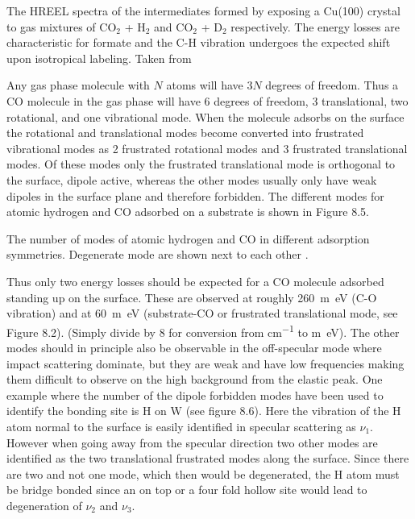 \vspace*{11cm}

 The HREEL spectra of the intermediates formed by exposing a Cu(100) crystal to gas mixtures of  CO$_{2}$ + H$_{2}$ and  CO$_{2}$ + D$_{2}$ respectively. The energy losses are characteristic for formate and the C-H vibration undergoes the expected shift upon isotropical labeling. Taken from \cite{Formate}

\vspace{1cm}

Any gas phase molecule with $N$ atoms  will have $3N$ degrees of freedom. Thus a CO molecule in the gas phase will have 6 degrees of freedom, 3 translational, two rotational, and one vibrational mode. When the molecule adsorbs on the surface the rotational and translational modes become converted into frustrated vibrational modes as 2 frustrated rotational modes and 3 frustrated translational modes. Of these modes only the frustrated translational mode is orthogonal to the surface, dipole active, whereas the other modes usually only have weak dipoles in the surface plane and therefore forbidden. The different modes for atomic hydrogen and CO adsorbed on a substrate is shown in Figure 8.5.

\vspace*{11cm}

 The number of modes of atomic hydrogen and CO in different adsorption symmetries. Degenerate mode are shown next to each other \cite{Bradshaw}.

\vspace{1cm} 

Thus only two energy losses should be expected for a CO molecule adsorbed standing up on the surface. These are observed at roughly \SI{260}{m\electronvolt} (C-O vibration) and at \SI{60}{m\electronvolt} (substrate-CO or frustrated translational mode, see Figure 8.2). (Simply divide by 8 for conversion from \si{cm^{-1}} to \si{m\electronvolt}). The other modes should in principle also be observable in the off-specular mode where impact scattering dominate, but they are weak and have low frequencies making them difficult to observe on the high background from the elastic peak. One example where the number of the dipole forbidden modes have been used to identify the bonding site is H on W \cite{Barnes} (see figure 8.6). Here the vibration of the H atom normal to the surface is easily identified in specular scattering as  $\nu_1$. However when going away from the specular direction two other modes are  identified as the two translational frustrated modes along the surface. Since there are two and not one mode, which then would be degenerated, the H atom must be bridge bonded since an on top or a  four fold hollow site would lead to degeneration of $\nu_2$ and $\nu_3$.

